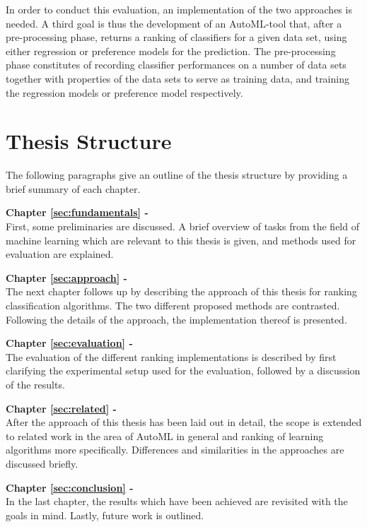 In order to conduct this evaluation, an implementation of the two approaches is needed. A third goal is thus the development of an AutoML-tool that, after a pre-processing phase, returns a ranking of classifiers for a given data set, using either regression or preference models for the prediction. The pre-processing phase constitutes of recording classifier performances on a number of data sets together with properties of the data sets to serve as training data, and training the regression models or preference model respectively.

\section{Thesis Structure}
\label{sec:intro:structure}
The following paragraphs give an outline of the thesis structure by providing a brief summary of each chapter.

\textbf{Chapter \ref{sec:fundamentals} - } \\[0.2em]
First, some preliminaries are discussed. A brief overview of tasks from the field of machine learning which are relevant to this thesis is given, and methods used for evaluation are explained. 

\textbf{Chapter \ref{sec:approach} - } \\[0.2em]
The next chapter follows up by describing the approach of this thesis for ranking classification algorithms. The two different proposed methods are contrasted. Following the details of the approach, the implementation thereof is presented.

\textbf{Chapter \ref{sec:evaluation} - } \\[0.2em]
The evaluation of the different ranking implementations is described by first clarifying the experimental setup used for the evaluation, followed by a discussion of the results.

\textbf{Chapter \ref{sec:related} - } \\[0.2em]
After the approach of this thesis has been laid out in detail, the scope is extended to related work in the area of AutoML in general and ranking of learning algorithms more specifically. Differences and similarities in the approaches are discussed briefly.

\textbf{Chapter \ref{sec:conclusion} - } \\[0.2em]
In the last chapter, the results which have been achieved are revisited with the goals in mind. Lastly, future work is outlined.

